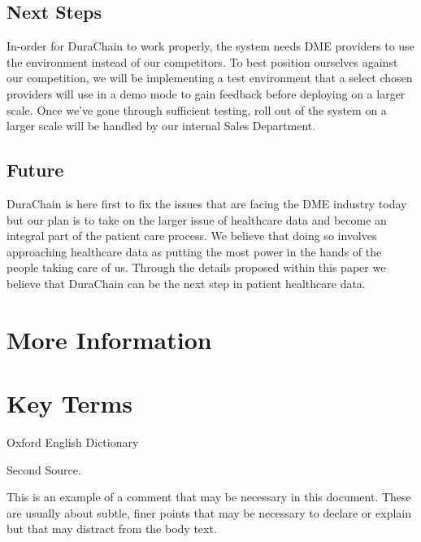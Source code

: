 \documentclass[preprint,pre,floats,aps,amsmath,amssymb]{revtex4-1}
\begin{document}


\subsection{Next Steps}
In-order for DuraChain to work properly, the system needs DME providers to use the environment instead of our competitors. To best position ourselves against our competition, we will be implementing a test environment that a select chosen providers will use in a demo mode to gain feedback before deploying on a larger scale. Once we’ve gone through sufficient testing, roll out of the system on a larger scale will be handled by our internal Sales Department.

\subsection{Future}
DuraChain is here first to fix the issues that are facing the DME industry today but our plan is to take on the larger issue of healthcare data and become an integral part of the patient care process. We believe that doing so involves approaching healthcare data as putting the most power in the hands of the people taking care of us. Through the details proposed within this paper we believe that DuraChain can be the next step in patient healthcare data.

\begin{acknowledgments}
\end{acknowledgments}


\appendix*
\section{More Information}

\appendix*
\section{Key Terms}

\begin{thebibliography}{99}


 Oxford English Dictionary

 Second Source.

 This is an example of a comment that may be necessary in this
document. These are usually about subtle, finer points
that may be necessary to declare or explain but that may distract from
the body text.

\end{thebibliography}
\end{document}
